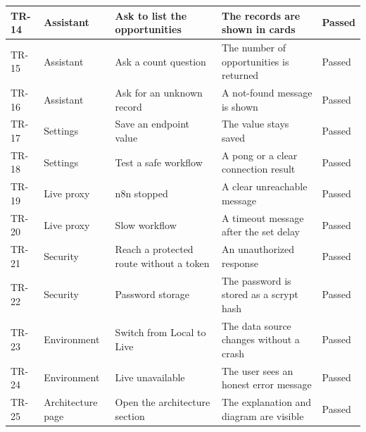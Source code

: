 \documentclass[12pt,a4paper,oneside]{report}
\begin{document}
\begin{longtable}{|p{1.2cm}|p{2.8cm}|p{4.4cm}|p{3.8cm}|p{1.3cm}|}
\hline
TR-14 & Assistant & Ask to list the opportunities & The records are shown in cards & Passed \\
\hline
TR-15 & Assistant & Ask a count question & The number of opportunities is returned & Passed \\
\hline
TR-16 & Assistant & Ask for an unknown record & A not-found message is shown & Passed \\
\hline
TR-17 & Settings & Save an endpoint value & The value stays saved & Passed \\
\hline
TR-18 & Settings & Test a safe workflow & A pong or a clear connection result & Passed \\
\hline
TR-19 & Live proxy & n8n stopped & A clear unreachable message & Passed \\
\hline
TR-20 & Live proxy & Slow workflow & A timeout message after the set delay & Passed \\
\hline
TR-21 & Security & Reach a protected route without a token & An unauthorized response & Passed \\
\hline
TR-22 & Security & Password storage & The password is stored as a scrypt hash & Passed \\
\hline
TR-23 & Environment & Switch from Local to Live & The data source changes without a crash & Passed \\
\hline
TR-24 & Environment & Live unavailable & The user sees an honest error message & Passed \\
\hline
TR-25 & Architecture page & Open the architecture section & The explanation and diagram are visible & Passed \\
\hline
\end{longtable}
\normalsize
\end{document}
